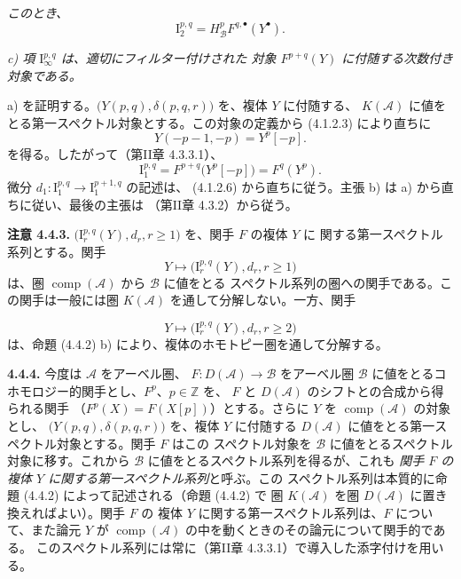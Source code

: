\clearpage
{}%
\begingroup\small\setlength{\parskip}{0pt}\setlength{\emergencystretch}{1.5em}
\setlength{\abovedisplayskip}{4pt plus 2pt minus 2pt}%
\setlength{\belowdisplayskip}{4pt plus 2pt minus 2pt}%

\noindent\textit{このとき、}
\[
\mathrm I_2^{p,q}=H_{\mathcal B}^pF^{q,\bullet}(Y^\bullet).
\]

\noindent\textit{c) 項 $\mathrm I_\infty^{p,q}$ は、適切にフィルター付けされた
対象 $F^{p+q}(Y)$ に付随する次数付き対象である。}

a) を証明する。$\bigl(Y(p,q),\delta(p,q,r)\bigr)$ を、複体 $Y$ に付随する、
$K(\mathcal A)$ に値をとる第一スペクトル対象とする。この対象の定義から
(4.1.2.3) により直ちに
\[
Y(-p-1,-p)=Y^p[-p].
\]
を得る。したがって（第II章 4.3.3.1）、
\[
\mathrm I_1^{p,q}=F^{p+q}\bigl(Y^p[-p]\bigr)=F^q(Y^p).
\]
微分 $d_1\colon\mathrm I_1^{p,q}\longrightarrow\mathrm I_1^{p+1,q}$ の記述は、
(4.1.2.6) から直ちに従う。主張 b) は a) から直ちに従い、最後の主張は
（第II章 4.3.2）から従う。

\medskip\noindent\textbf{注意 4.4.3.}\quad
$\bigl(\mathrm I_r^{p,q}(Y),d_r,r\geq1\bigr)$ を、関手 $F$ の複体 $Y$ に
関する第一スペクトル系列とする。関手
\[
Y\longmapsto\bigl(\mathrm I_r^{p,q}(Y),d_r,r\geq1\bigr)
\]
は、圏 $\operatorname{comp}(\mathcal A)$ から $\mathcal B$ に値をとる
スペクトル系列の圏への関手である。この関手は一般には圏
$K(\mathcal A)$ を通して分解しない。一方、関手

\[
Y\longmapsto\bigl(\mathrm I_r^{p,q}(Y),d_r,r\geq2\bigr)
\]
は、命題 (4.4.2) b) により、複体のホモトピー圏を通して分解する。

\medskip\noindent\textbf{4.4.4.}\quad
今度は $\mathcal A$ をアーベル圏、
$F\colon D(\mathcal A)\longrightarrow\mathcal B$ をアーベル圏
$\mathcal B$ に値をとるコホモロジー的関手とし、$F^p$、$p\in\mathbb Z$ を、
$F$ と $D(\mathcal A)$ のシフトとの合成から得られる関手
（$F^p(X)=F(X[p])$）とする。さらに $Y$ を
$\operatorname{comp}(\mathcal A)$ の対象とし、
$\bigl(Y(p,q),\delta(p,q,r)\bigr)$ を、複体 $Y$ に付随する
$D(\mathcal A)$ に値をとる第一スペクトル対象とする。関手 $F$ はこの
スペクトル対象を $\mathcal B$ に値をとるスペクトル対象に移す。これから
$\mathcal B$ に値をとるスペクトル系列を得るが、これも
\emph{関手 $F$ の複体 $Y$ に関する第一スペクトル系列}と呼ぶ。この
スペクトル系列は本質的に命題 (4.4.2) によって記述される（命題 (4.4.2) で
圏 $K(\mathcal A)$ を圏 $D(\mathcal A)$ に置き換えればよい）。関手 $F$ の
複体 $Y$ に関する第一スペクトル系列は、$F$ について、また論元 $Y$ が
$\operatorname{comp}(\mathcal A)$ の中を動くときのその論元について関手的である。
このスペクトル系列には常に（第II章 4.3.3.1）で導入した添字付けを用いる。
\endgroup
